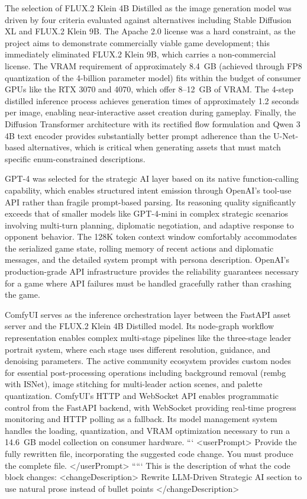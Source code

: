 \documentclass[conference]{IEEEtran}
\begin{document}
The selection of FLUX.2 Klein 4B Distilled as the image generation model was driven by four criteria evaluated against alternatives including Stable Diffusion XL and FLUX.2 Klein 9B. The Apache 2.0 license was a hard constraint, as the project aims to demonstrate commercially viable game development; this immediately eliminated FLUX.2 Klein 9B, which carries a non-commercial license. The VRAM requirement of approximately 8.4~GB (achieved through FP8 quantization of the 4-billion parameter model) fits within the budget of consumer GPUs like the RTX 3070 and 4070, which offer 8--12~GB of VRAM. The 4-step distilled inference process achieves generation times of approximately 1.2 seconds per image, enabling near-interactive asset creation during gameplay. Finally, the Diffusion Transformer architecture with its rectified flow formulation and Qwen 3 4B text encoder provides substantially better prompt adherence than the U-Net-based alternatives, which is critical when generating assets that must match specific enum-constrained descriptions.

GPT-4 was selected for the strategic AI layer based on its native function-calling capability, which enables structured intent emission through OpenAI's tool-use API rather than fragile prompt-based parsing. Its reasoning quality significantly exceeds that of smaller models like GPT-4-mini in complex strategic scenarios involving multi-turn planning, diplomatic negotiation, and adaptive response to opponent behavior. The 128K token context window comfortably accommodates the serialized game state, rolling memory of recent actions and diplomatic messages, and the detailed system prompt with persona description. OpenAI's production-grade API infrastructure provides the reliability guarantees necessary for a game where API failures must be handled gracefully rather than crashing the game.

ComfyUI serves as the inference orchestration layer between the FastAPI asset server and the FLUX.2 Klein 4B Distilled model. Its node-graph workflow representation enables complex multi-stage pipelines like the three-stage leader portrait system, where each stage uses different resolution, guidance, and denoising parameters. The active community ecosystem provides custom nodes for essential post-processing operations including background removal (rembg with ISNet), image stitching for multi-leader action scenes, and palette quantization. ComfyUI's HTTP and WebSocket API enables programmatic control from the FastAPI backend, with WebSocket providing real-time progress monitoring and HTTP polling as a fallback. Its model management system handles the loading, quantization, and VRAM optimization necessary to run a 14.6~GB model collection on consumer hardware.
```
<userPrompt>
Provide the fully rewritten file, incorporating the suggested code change. You must produce the complete file.
</userPrompt>
`````
This is the description of what the code block changes:
<changeDescription>
Rewrite LLM-Driven Strategic AI section to use natural prose instead of bullet points
</changeDescription>
\end{document}
